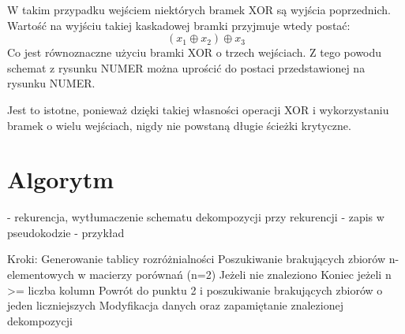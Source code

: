 W takim przypadku wejściem niektórych bramek XOR są wyjścia poprzednich.
Wartość na wyjściu takiej kaskadowej bramki przyjmuje wtedy postać:
\begin{equation}
(x_1 \oplus x_2) \oplus x_3
\end{equation}
Co jest równoznaczne użyciu bramki XOR o trzech wejściach.
Z tego powodu schemat z rysunku NUMER można uprościć do postaci przedstawionej na rysunku NUMER.

Jest to istotne,
ponieważ dzięki takiej własności operacji XOR i wykorzystaniu bramek o wielu wejściach,
nigdy nie powstaną długie ścieżki krytyczne.

\section{Algorytm}
- rekurencja, wytłumaczenie schematu dekompozycji przy rekurencji
- zapis w pseudokodzie
- przykład

Kroki:
Generowanie tablicy rozróżnialności
Poszukiwanie brakujących zbiorów n-elementowych w macierzy porównań (n=2)
Jeżeli nie znaleziono
Koniec jeżeli n >= liczba kolumn
Powrót do punktu 2 i poszukiwanie brakujących zbiorów o jeden liczniejszych
Modyfikacja danych oraz zapamiętanie znalezionej dekompozycji
